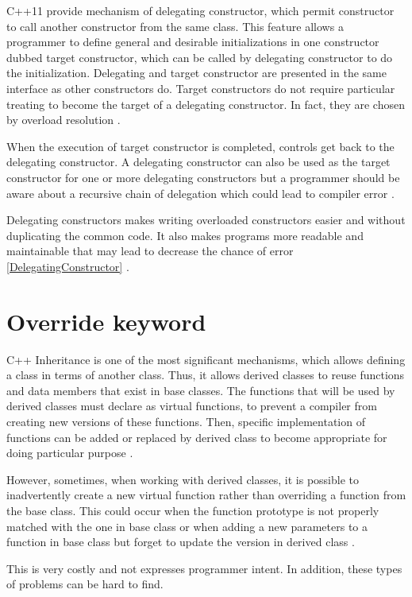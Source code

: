 \documentclass[11pt]{report}
\begin{document}
C++11 provide mechanism of delegating constructor, which permit constructor to call another constructor from the same class. This feature allows a programmer to define general and desirable initializations in one constructor dubbed target constructor, which can be called by delegating constructor to do the initialization. Delegating and target constructor are presented in the same interface as other constructors do. Target constructors do not require particular treating to become the target of a delegating constructor. In fact, they are chosen by overload resolution \cite{Overland:2011:CWF}.


When the execution of target constructor is completed, controls get back to the delegating constructor. A delegating constructor can also be used as the target constructor for one or more delegating constructors but a programmer should be aware about a recursive chain of delegation which could lead to compiler error \cite{Overland:2011:CWF}.


Delegating constructors makes writing overloaded constructors easier and without duplicating the common code. It also makes programs more readable and maintainable that may lead to decrease the chance of error \ref{DelegatingConstructor} \cite{Overland:2011:CWF}.

\section{Override keyword}
\label{section: Override keyword}
C++ Inheritance is one of the most significant mechanisms, which allows defining a class in terms of another class. Thus, it allows derived classes to reuse functions and data members that exist in base classes. The functions that will be used by derived classes must declare as virtual functions, to prevent a compiler from creating new versions of these functions. Then, specific implementation of functions can be added or replaced by derived class to become appropriate for doing particular purpose \cite{Stroustrup:2012:Cpp11}.


However, sometimes, when working with derived classes, it is possible to inadvertently create a new virtual function rather than overriding a function from the base class. This could occur when the function prototype is not properly matched with the one in base class or when adding a new parameters to a function in base class but forget to update the version in derived class \cite{Stroustrup:2012:Cpp11}.


This is very costly and not expresses programmer intent. In addition, these types of problems can be hard to find.
\end{document}
